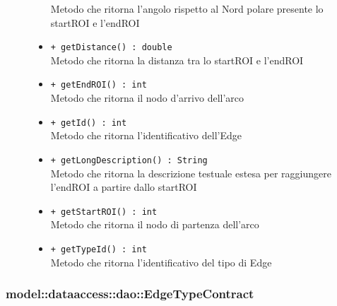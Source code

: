 \documentclass[../DefinizioneDiProdotto.tex]{subfiles}
\begin{document}
\begin{description}
\begin{itemize}
Metodo che ritorna l'angolo rispetto al Nord polare presente lo startROI e l'endROI
 \item \texttt{+ getDistance() : double}\\
Metodo che ritorna la distanza tra lo startROI e l'endROI
 \item \texttt{+ getEndROI() : int}\\
Metodo che ritorna il nodo d'arrivo dell'arco
 \item \texttt{+ getId() : int}\\
Metodo che ritorna l'identificativo dell'Edge
 \item \texttt{+ getLongDescription() : String}\\
Metodo che ritorna la descrizione testuale estesa per raggiungere l'endROI a partire dallo startROI
 \item \texttt{+ getStartROI() : int}\\
Metodo che ritorna il nodo di partenza dell'arco
 \item \texttt{+ getTypeId() : int}\\
Metodo che ritorna l'identificativo del tipo di Edge
 \end{itemize}
\end{description}

\subsubsection{model::dataaccess::dao::EdgeTypeContract}
\end{document}
